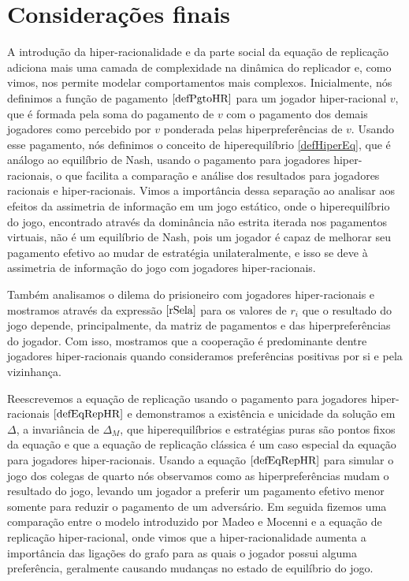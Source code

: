 \chapter{Considerações finais}

A introdução da hiper-racionalidade e da parte social da equação de replicação adiciona mais uma camada de complexidade na dinâmica do replicador e, como vimos, nos permite modelar comportamentos mais complexos. Inicialmente, nós definimos a função de pagamento $\eqref{defPgtoHR}$ para um jogador hiper-racional $v$, que é formada pela soma do pagamento de $v$ com o pagamento dos demais jogadores como percebido por $v$ ponderada pelas hiperpreferências de $v$. Usando esse pagamento, nós definimos o conceito de hiperequilíbrio \ref{defHiperEq}, que é análogo ao equilíbrio de Nash, usando o pagamento para jogadores hiper-racionais, o que facilita a comparação e análise dos resultados para jogadores racionais e hiper-racionais. Vimos a importância dessa separação ao analisar aos efeitos da assimetria de informação em um jogo estático, onde o hiperequilíbrio do jogo, encontrado através da dominância não estrita iterada nos pagamentos virtuais, não é um equilíbrio de Nash, pois um jogador é capaz de melhorar seu pagamento efetivo ao mudar de estratégia unilateralmente, e isso se deve à assimetria de informação do jogo com jogadores hiper-racionais.

Também analisamos o dilema do prisioneiro com jogadores hiper-racionais e mostramos através da expressão $\eqref{rSela}$ para os valores de $r_i$ que o resultado do jogo depende, principalmente, da matriz de pagamentos e das hiperpreferências do jogador. Com isso, mostramos que a cooperação é predominante dentre jogadores hiper-racionais quando consideramos preferências positivas por si e pela vizinhança.

Reescrevemos a equação de replicação usando o pagamento para jogadores hiper-racionais $\eqref{defEqRepHR}$ e demonstramos a existência e unicidade da solução em $\Delta$, a invariância de $\Delta_M$, que hiperequilíbrios e estratégias puras são pontos fixos da equação e que a equação de replicação clássica é um caso especial da equação para jogadores hiper-racionais. Usando a equação $\eqref{defEqRepHR}$ para simular o jogo dos colegas de quarto nós observamos como as hiperpreferências mudam o resultado do jogo, levando um jogador a preferir um pagamento efetivo menor somente para reduzir o pagamento de um adversário. Em seguida fizemos uma comparação entre o modelo introduzido por Madeo e Mocenni \cite{madeo2015} e a equação de replicação hiper-racional, onde vimos que a hiper-racionalidade aumenta a importância das ligações do grafo para as quais o jogador possui alguma preferência, geralmente causando mudanças no estado de equilíbrio do jogo.


